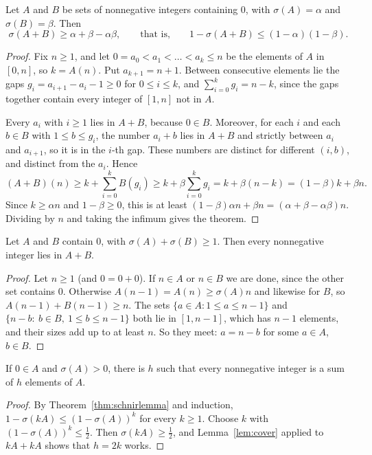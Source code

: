 \begin{theorem}\label{thm:schnirlemma}
Let $A$ and $B$ be sets of nonnegative integers containing $0$, with $\sigma(A)=\alpha$ and $\sigma(B)=\beta$. Then
\[
\sigma(A+B)\ge\alpha+\beta-\alpha\beta,\qquad\text{that is,}\qquad1-\sigma(A+B)\le(1-\alpha)(1-\beta).
\]
\end{theorem}
\begin{proof}
Fix $n\ge1$, and let $0=a_0<a_1<\dots<a_k\le n$ be the elements of $A$ in $[0,n]$, so $k=A(n)$. Put $a_{k+1}=n+1$. Between consecutive elements lie the
gaps $g_i=a_{i+1}-a_i-1\ge0$ for $0\le i\le k$, and $\sum_{i=0}^kg_i=n-k$, since the gaps together contain every integer of $[1,n]$ not in $A$.

Every $a_i$ with $i\ge1$ lies in $A+B$, because $0\in B$. Moreover, for each $i$ and each $b\in B$ with $1\le b\le g_i$, the number $a_i+b$ lies in
$A+B$ and strictly between $a_i$ and $a_{i+1}$, so it is in the $i$-th gap. These numbers are distinct for different $(i,b)$, and distinct from the
$a_i$. Hence
\[
(A+B)(n)\ge k+\sum_{i=0}^kB(g_i)\ge k+\beta\sum_{i=0}^kg_i=k+\beta(n-k)=(1-\beta)k+\beta n.
\]
Since $k\ge\alpha n$ and $1-\beta\ge0$, this is at least $(1-\beta)\alpha n+\beta n=(\alpha+\beta-\alpha\beta)n$. Dividing by $n$ and taking the infimum
gives the theorem.
\end{proof}

\begin{lemma}\label{lem:cover}
Let $A$ and $B$ contain $0$, with $\sigma(A)+\sigma(B)\ge1$. Then every nonnegative integer lies in $A+B$.
\end{lemma}
\begin{proof}
Let $n\ge1$ (and $0=0+0$). If $n\in A$ or $n\in B$ we are done, since the other set contains $0$. Otherwise $A(n-1)=A(n)\ge\sigma(A)n$ and likewise for
$B$, so $A(n-1)+B(n-1)\ge n$. The sets $\{a\in A:1\le a\le n-1\}$ and $\{n-b:\ b\in B,\ 1\le b\le n-1\}$ both lie in $[1,n-1]$, which has $n-1$
elements, and their sizes add up to at least $n$. So they meet: $a=n-b$ for some $a\in A$, $b\in B$.
\end{proof}

\begin{corollary}\label{cor:basis}
If $0\in A$ and $\sigma(A)>0$, there is $h$ such that every nonnegative integer is a sum of $h$ elements of $A$.
\end{corollary}
\begin{proof}
By Theorem~\ref{thm:schnirlemma} and induction, $1-\sigma(kA)\le(1-\sigma(A))^k$ for every $k\ge1$. Choose $k$ with $(1-\sigma(A))^k\le\frac12$. Then
$\sigma(kA)\ge\frac12$, and Lemma~\ref{lem:cover} applied to $kA+kA$ shows that $h=2k$ works.
\end{proof}

